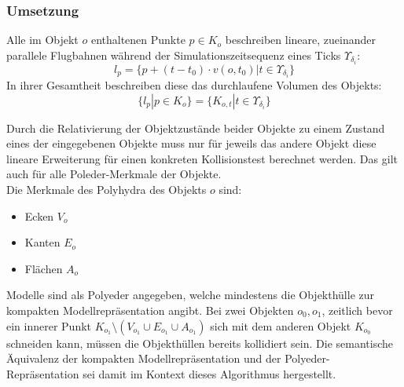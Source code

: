 \subsubsection{Umsetzung}
Alle im Objekt $o$ enthaltenen Punkte $p \in K_o$ beschreiben lineare, zueinander parallele Flugbahnen während der Simulationszeitsequenz eines Ticks $\Upsilon_{\delta_i}$:
$$l_p = \{ p + (t - t_0) \cdot v(o, t_0) | t \in \Upsilon_{\delta_i} \}$$
In ihrer Gesamtheit beschreiben diese das durchlaufene Volumen des Objekts:
$$\{l_p|p\in K_o\} = \{K_{o, t}| t \in \Upsilon_{\delta_i}\}$$

Durch die Relativierung der Objektzustände beider Objekte zu einem Zustand eines der eingegebenen Objekte muss nur für jeweils das andere Objekt diese lineare Erweiterung für einen konkreten Kollisionstest berechnet werden. Das gilt auch für alle Poleder-Merkmale der Objekte.\\
Die Merkmale des Polyhydra des Objekts $o$ sind:
\begin{itemize}
\item Ecken $V_o$
\item Kanten $E_o$
\item Flächen $A_o$
\end{itemize}
Modelle sind als Polyeder angegeben, welche mindestens die Objekthülle zur kompakten Modellrepräsentation angibt. Bei zwei Objekten $o_0, o_1$, zeitlich bevor ein innerer Punkt $K_{o_1} \setminus (V_{o_1} \cup E_{o_1} \cup A_{o_1})$ sich mit dem anderen Objekt $K_{o_0}$ schneiden kann, müssen die Objekthüllen bereits kollidiert sein. Die semantische Äquivalenz der kompakten Modellrepräsentation und der Polyeder-Repräsentation sei damit im Kontext dieses Algorithmus hergestellt.\\


